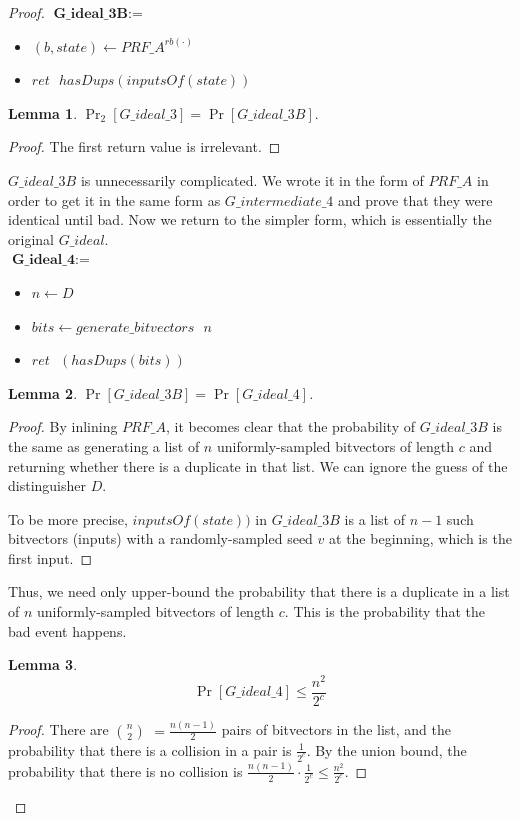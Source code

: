 \documentclass[12pt,lot, lof]{puthesis}
\newenvironment{game}
{ \begin{itemize}[noitemsep,nolistsep] 
}
{ \end{itemize}                  }
\newcommand{\s} {\textrm{ }}
\newcommand{\f}{\frac}
\newtheorem{lem}{Lemma}[thm]
\begin{document}
{\begin{proof}
$\textbf{G\_ideal\_3B} := $
\begin{game}
\item[] $(b, state) \leftarrow PRF\_A^{rb(\cdot)}$ 
\item[] $ret \s hasDups(inputsOf(state))$ 
\end{game}

\begin{lem}$\Pr_2[G\_ideal\_3] = \Pr[G\_ideal\_3B].$\end{lem}
\begin{proof}The first return value is irrelevant.\end{proof}

$G\_ideal\_3B$ is unnecessarily complicated. We wrote it in the form of $PRF\_A$ in order to get it in the same form as $G\_intermediate\_4$ and prove that they were identical until bad. Now we return to the simpler form, which is essentially the original $G\_ideal$.\\

$\textbf{G\_ideal\_4} := $
\begin{game}
\item[] $n \leftarrow D$
\item[] $bits \leftarrow generate\_bitvectors \s n$
\item[] $ret \s (hasDups(bits))$ 
\end{game}

\begin{lem}$\Pr[G\_ideal\_3B] = \Pr[G\_ideal\_4]$.\end{lem}
\begin{proof}
By inlining $PRF\_A$, it becomes clear that the probability of $G\_ideal\_3B$ is the same as generating a list of $n$ uniformly-sampled bitvectors of length $c$ and returning whether there is a duplicate in that list. We can ignore the guess of the distinguisher $D$. %

To be more precise, $inputsOf(state))$ in $G\_ideal\_3B$ is a list of $n-1$ such bitvectors (inputs) with a randomly-sampled seed $v$ at the beginning, which is the first input.
\end{proof}

Thus, we need only upper-bound the probability that there is a duplicate in a list of $n$ uniformly-sampled bitvectors of length $c$. This is the probability that the bad event happens.

\begin{lem}$$\Pr[G\_ideal\_4] \leq \f{n^2}{2^c}$$\end{lem}
\begin{proof} There are $n \choose 2$ $= \f{n(n-1)}{2}$ pairs of bitvectors in the list, and the probability that there is a collision in a pair is $\f{1}{2^c}$. By the union bound, the probability that there is no collision is $\f{n(n-1)}{2} \cdot \f{1}{2^c} \leq \f{n^2}{2^c}.$ \end{proof}


\end{proof}}
\end{document}
